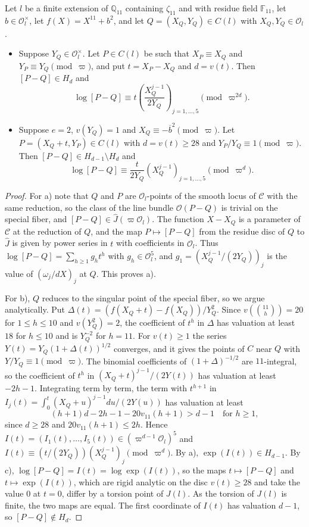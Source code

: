 \documentclass[11pt,reqno]{amsart}
\newcommand{\Q}{\mathbb{Q}}
\newcommand{\F}{\mathbb{F}}
\newcommand{\OO}{\mathcal{O}}
\newcommand{\Jhat}{\widehat{J}}
\theoremstyle{definition}
\numberwithin{equation}{section}
\begin{document}
\begin{lemma}\label{lem:discs}
Let $l$ be a finite extension of $\Q_{11}$ containing $\zeta_{11}$ and with residue field $\F_{11}$, let $b\in\OO_l^\times$, let $f(X)=X^{11}+b^2$, and let $Q=(X_Q,Y_Q)\in C(l)$ with $X_Q,Y_Q\in \OO_l$.
\begin{itemize}
\item[a)] Suppose $Y_Q\in\OO_l^\times$. Let $P\in C(l)$ be such that $X_P\equiv X_Q$ and $Y_P\equiv Y_Q \pmod\varpi$, and put $t=X_P-X_Q$ and $d=v(t)$. Then $[P-Q]\in H_d$ and
$$\log[P-Q]\equiv t\left(\frac{X_Q^{j-1}}{2Y_Q}\right)_{j=1,\ldots,5}\pmod{\varpi^{2d}}.$$
\item[b)] Suppose $e=2$, $v(Y_Q)=1$ and $X_Q\equiv -\overline b^2\pmod\varpi$. Let $P=(X_Q+t,Y_P)\in C(l)$ with $d=v(t)\geq 28$ and $Y_P/Y_Q\equiv 1\pmod\varpi$. Then $[P-Q]\in H_{d-1}\setminus H_d$ and
$$\log[P-Q]\equiv \frac{t}{2Y_Q}\left(X_Q^{j-1}\right)_{j=1,\ldots,5}\pmod{\varpi^{d}}.$$
\end{itemize}
\end{lemma}

\begin{proof}
For a) note that $Q$ and $P$ are $\OO_l$-points of the smooth locus of $\mathcal C$ with the same reduction, so the class of the line bundle $\OO(P-Q)$ is trivial on the special fiber, and $[P-Q]\in\Jhat(\varpi\OO_l)$. The function $X-X_Q$ is a parameter of $\mathcal C$ at the reduction of $Q$, and the map $P\mapsto [P-Q]$ from the residue disc of $Q$ to $\Jhat$ is given by power series in $t$ with coefficients in $\OO_l$. Thus $\log[P-Q]=\sum_{h\geq 1}g_ht^h$ with $g_h\in\OO_l^5$, and $g_1=(X_Q^{j-1}/(2Y_Q))_j$ is the value of $(\omega_j/dX)_j$ at $Q$. This proves a).

For b), $Q$ reduces to the singular point of the special fiber, so we argue analytically. Put $\Delta(t)=(f(X_Q+t)-f(X_Q))/Y_Q^2$. Since $v(\binom{11}{h})=20$ for $1\leq h\leq 10$ and $v(Y_Q^2)=2$, the coefficient of $t^h$ in $\Delta$ has valuation at least $18$ for $h\leq 10$ and is $Y_Q^{-2}$ for $h=11$. For $v(t)\geq 1$ the series $Y(t)=Y_Q(1+\Delta(t))^{1/2}$ converges, and it gives the points of $C$ near $Q$ with $Y/Y_Q\equiv 1\pmod\varpi$. The binomial coefficients of $(1+\Delta)^{-1/2}$ are $11$-integral, so the coefficient of $t^h$ in $(X_Q+t)^{j-1}/(2Y(t))$ has valuation at least $-2h-1$. Integrating term by term, the term with $t^{h+1}$ in $I_j(t)=\int_0^t (X_Q+u)^{j-1}du/(2Y(u))$ has valuation at least
$$(h+1)d-2h-1-20v_{11}(h+1)>d-1 \quad\text{for } h\geq 1,$$
since $d\geq 28$ and $20v_{11}(h+1)\leq 2h$. Hence $I(t)=(I_1(t),\ldots,I_5(t))\in(\varpi^{d-1}\OO_l)^5$ and $I(t)\equiv (t/(2Y_Q))(X_Q^{j-1})_j\pmod{\varpi^d}$. By  a), $\exp(I(t))\in H_{d-1}$. By  c), $\log[P-Q]=I(t)=\log\exp(I(t))$, so the maps $t\mapsto [P-Q]$ and $t\mapsto \exp(I(t))$, which are rigid analytic on the disc $v(t)\geq 28$ and take the value $0$ at $t=0$, differ by a torsion point of $J(l)$. As the torsion of $J(l)$ is finite, the two maps are equal. The first coordinate of $I(t)$ has valuation $d-1$, so $[P-Q]\notin H_d$.
\end{proof}
\end{document}
